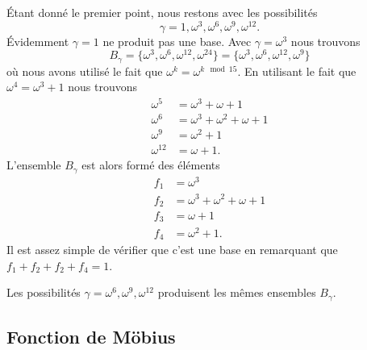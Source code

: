 \begin{example}
\begin{enumerate}
		      Étant donné le premier point, nous restons avec les possibilités
		      \begin{equation}
			      \gamma=1,\omega^3,\omega^6,\omega^9,\omega^{12}.
		      \end{equation}
		      Évidemment \( \gamma=1\) ne produit pas une base. Avec \( \gamma=\omega^3\) nous trouvons
		      \begin{equation}
			      B_{\gamma}=\{ \omega^3,\omega^6,\omega^{12},\omega^{24} \}=\{ \omega^3,\omega^6,\omega^{12},\omega^9 \}
		      \end{equation}
		      où nous avons utilisé le fait que \( \omega^k=\omega^{k\mod 15}\). En utilisant le fait que \( \omega^4=\omega^3+1\) nous trouvons
		      \begin{subequations}
			      \begin{align}
				      \omega^5    & =\omega^3+\omega+1          \\
				      \omega^6    & =\omega^3+\omega^2+\omega+1 \\
				      \omega^9    & =\omega^2+1                 \\
				      \omega^{12} & =\omega+1.
			      \end{align}
		      \end{subequations}
		      L'ensemble \( B_{\gamma}\) est alors formé des éléments
		      \begin{subequations}
			      \begin{align}
				      f_1 & =\omega^3                   \\
				      f_2 & =\omega^3+\omega^2+\omega+1 \\
				      f_3 & =\omega+1                   \\
				      f_4 & =\omega^2+1.
			      \end{align}
		      \end{subequations}
		      Il est assez simple de vérifier que c'est une base en remarquant que \( f_1+f_2+f_2+f_4=1\).

		      Les possibilités \( \gamma=\omega^6,\omega^9,\omega^{12}\) produisent les mêmes ensembles \( B_{\gamma}\).
	\end{enumerate}
\end{example}


\subsection{Fonction de Möbius}

